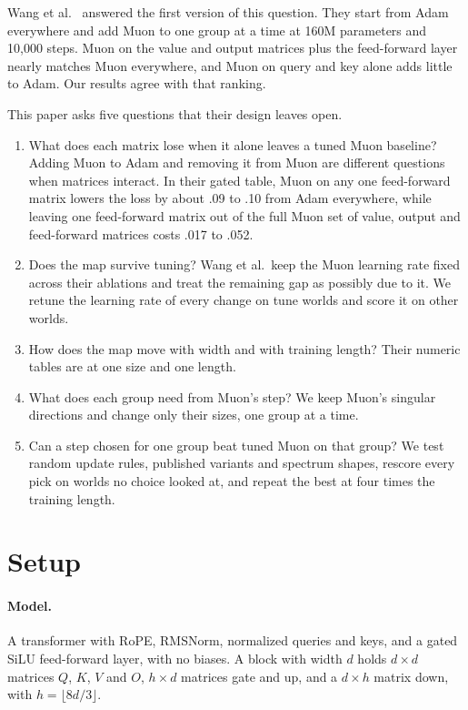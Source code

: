 \documentclass[11pt]{article}
\begin{document}
Wang et al.~\cite{wang2025tail} answered the first version of this question. They start from Adam everywhere and add Muon to one group at a time at 160M parameters and 10,000 steps. Muon on the value and output matrices plus the feed-forward layer nearly matches Muon everywhere, and Muon on query and key alone adds little to Adam. Our results agree with that ranking.

This paper asks five questions that their design leaves open.

\begin{enumerate}
\item What does each matrix lose when it alone leaves a tuned Muon baseline? Adding Muon to Adam and removing it from Muon are different questions when matrices interact. In their gated table, Muon on any one feed-forward matrix lowers the loss by about .09 to .10 from Adam everywhere, while leaving one feed-forward matrix out of the full Muon set of value, output and feed-forward matrices costs .017 to .052.
\item Does the map survive tuning? Wang et al.\ keep the Muon learning rate fixed across their ablations and treat the remaining gap as possibly due to it. We retune the learning rate of every change on tune worlds and score it on other worlds.
\item How does the map move with width and with training length? Their numeric tables are at one size and one length.
\item What does each group need from Muon's step? We keep Muon's singular directions and change only their sizes, one group at a time.
\item Can a step chosen for one group beat tuned Muon on that group? We test random update rules, published variants and spectrum shapes, rescore every pick on worlds no choice looked at, and repeat the best at four times the training length.
\end{enumerate}

\section{Setup}

\paragraph{Model.} A transformer with RoPE, RMSNorm, normalized queries and keys, and a gated SiLU feed-forward layer, with no biases. A block with width $d$ holds $d\times d$ matrices $Q$, $K$, $V$ and $O$, $h\times d$ matrices gate and up, and a $d\times h$ matrix down, with $h=\lfloor 8d/3\rfloor$.
\end{document}
